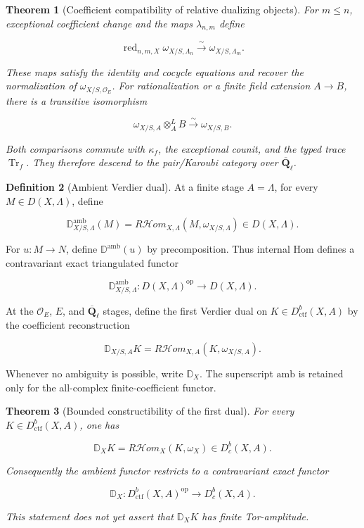 \documentclass[10pt]{article}
\newtheorem{theorem}{Theorem}[section]
\theoremstyle{definition}
\newtheorem{definition}[theorem]{Definition}
\newcommand{\Qlb}{\overline{\mathbf Q}_\ell}
\newcommand{\OO}{\mathcal O}
\newcommand{\Dbc}{D^b_c}
\newcommand{\Dctf}{D^b_{\mathrm{ctf}}}
\newcommand{\RHom}{R\mathcal Hom}
\newcommand{\red}{\operatorname{red}}
\newcommand{\DD}{\mathbb D}
\newcommand{\Tr}{\operatorname{Tr}}
\begin{document}
\begin{theorem}[Coefficient compatibility of relative dualizing objects]
For \(m\leq n\), exceptional coefficient change and the maps
\(\lambda_{n,m}\) define

\[
 \red_{n,m,X}\omega_{X/S,\Lambda_n}
 \xrightarrow{\sim}\omega_{X/S,\Lambda_m}.
\]

These maps satisfy the identity and cocycle equations and recover the
normalization of \(\omega_{X/S,\OO_E}\).  For rationalization or a finite
field extension \(A\to B\), there is a transitive isomorphism

\[
 \omega_{X/S,A}\otimes_A^LB\xrightarrow{\sim}\omega_{X/S,B}.
\]

Both comparisons commute with \(\kappa_f\), the exceptional counit, and the
typed trace \(\Tr_f\).  They therefore descend to the pair/Karoubi category
over \(\Qlb\).
\end{theorem}

\begin{definition}[Ambient Verdier dual]
At a finite stage \(A=\Lambda\), for every \(M\in D(X,\Lambda)\), define

\[
 \DD_{X/S,\Lambda}^{\mathrm{amb}}(M)
 =\RHom_{X,\Lambda}(M,\omega_{X/S,\Lambda})
 \in D(X,\Lambda).
\]

For \(u:M\to N\), define \(\DD^{\mathrm{amb}}(u)\) by
precomposition.  Thus internal Hom defines a contravariant exact
triangulated functor

\[
 \DD_{X/S,\Lambda}^{\mathrm{amb}}:
 D(X,\Lambda)^{\mathrm{op}}\longrightarrow D(X,\Lambda).
\]

At the \(\OO_E\), \(E\), and \(\Qlb\) stages, define the first Verdier dual
on \(K\in\Dctf(X,A)\) by the coefficient reconstruction

\[
 \DD_{X/S,A}K=\RHom_{X,A}(K,\omega_{X/S,A}).
\]

Whenever no ambiguity is possible, write \(\DD_X\).  The superscript
\(\mathrm{amb}\) is retained only for the all-complex finite-coefficient
functor.
\end{definition}

\begin{theorem}[Bounded constructibility of the first dual]
For every \(K\in\Dctf(X,A)\), one has

\[
 \DD_XK=\RHom_X(K,\omega_X)\in\Dbc(X,A).
\]

Consequently the ambient functor restricts to a contravariant exact functor

\[
 \DD_X:\Dctf(X,A)^{\mathrm{op}}\longrightarrow\Dbc(X,A).
\]

This statement does not yet assert that \(\DD_XK\) has finite Tor-amplitude.
\end{theorem}
\end{document}
